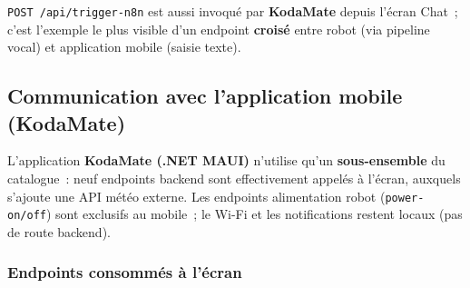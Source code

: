 \documentclass[a4paper,12pt]{report}
\begin{document}
	\noindent\texttt{POST /api/trigger-n8n} est aussi invoqué par \textbf{KodaMate} depuis
	l'écran Chat~; c'est l'exemple le plus visible d'un endpoint \textbf{croisé} entre
	robot (via pipeline vocal) et application mobile (saisie texte).
	
	\subsection{Communication avec l'application mobile (KodaMate)}
	\label{sec:ch4-endpoints-mobile}
	
	L'application \textbf{KodaMate (.NET MAUI)} n'utilise qu'un \textbf{sous-ensemble} du catalogue~: neuf
	endpoints backend sont effectivement appelés à l'écran, auxquels s'ajoute une API
	météo externe. Les endpoints \og alimentation robot \fg{} (\texttt{power-on/off})
	sont exclusifs au mobile~; le Wi-Fi et les notifications restent locaux (pas de route
	backend).
	
	\subsubsection{Endpoints consommés à l'écran}
	
\end{document}
